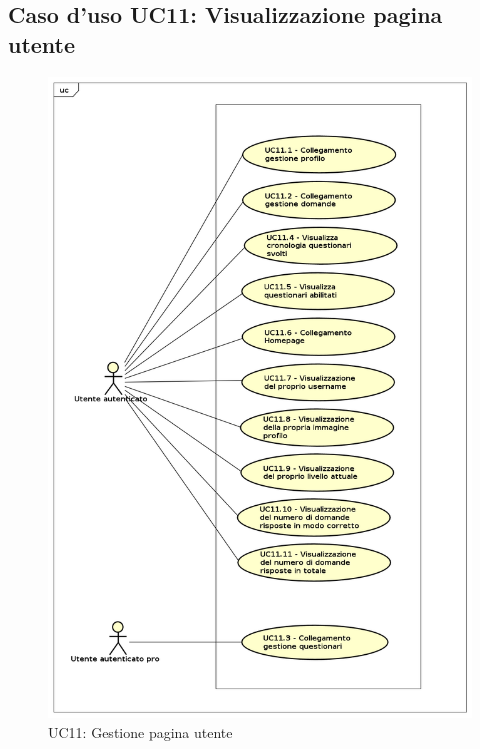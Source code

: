 \newpage
\subsection{Caso d'uso UC11: Visualizzazione pagina utente}
\label{UC11}
\begin{figure}[ht]
	\centering
	\includegraphics[scale=0.40]{UML/UC11.png}
	\caption{UC11: Gestione pagina utente}
\end{figure}
\FloatBarrier
